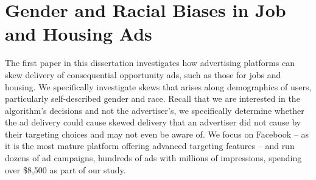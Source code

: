 \chapter{Gender and Racial Biases in Job and Housing Ads}\label{chap:cscw}
The first paper in this dissertation investigates how advertising platforms can skew delivery of consequential opportunity ads, such as those for jobs and housing. We specifically investigate skews that arises along demographics of users, particularly self-described gender and race. Recall that we are interested in the algorithm's decisions and not the advertiser's, we specifically determine whether the ad delivery could cause skewed delivery that an advertiser did not cause by their targeting choices and may not even be aware of.
%
We focus on Facebook -- as it is the most mature platform offering advanced targeting features -- and run dozens of ad campaigns, hundreds of ads with millions of impressions, spending over \$8,500 as part of our study.
